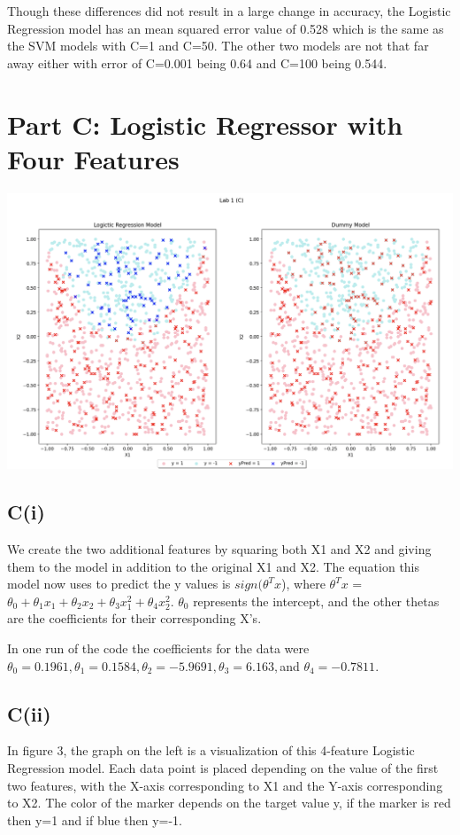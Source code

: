 \documentclass{article}
\begin{document}
Though these differences did not result in a large change in accuracy, the Logistic Regression model has an mean squared error value of 0.528 which is the same as the SVM models with C=1 and C=50. The other two models are not that far away either with error of C=0.001 being 0.64 and C=100 being 0.544.

\section{Part C: Logistic Regressor with Four Features}
\includegraphics[width=\linewidth]{pC.png}
\subsection{C(i)}
We create the two additional features by squaring both X1 and X2 and giving them to the model in addition to the original X1 and X2. The equation this model now uses to predict the y values is $sign(\theta^{T}x$), where $\theta^{T}x$ = $\theta_0 + \theta_1x_1 + \theta_2x_2 + \theta_3x_1^2 + \theta_4x_2^2$. $\theta_0$ represents the intercept, and the other thetas are the coefficients for their corresponding X's. 

In one run of the code the coefficients for the data were $\theta_0 = 0.1961, \theta_1 = 0.1584, \theta_2 = -5.9691, \theta_3 = 6.163, $and $\theta_4 = -0.7811.$

\subsection{C(ii)}
In figure 3, the graph on the left is a visualization of this 4-feature Logistic Regression model. Each data point is placed depending on the value of the first two features, with the X-axis corresponding to X1 and the Y-axis corresponding to X2. The color of the marker depends on the target value y, if the marker is red then y=1 and if blue then y=-1.
\end{document}
